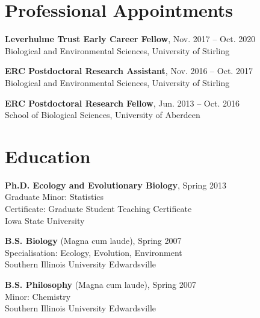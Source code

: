 \documentclass[letterpaper]{article}
\def\name{A. Bradley Duthie}
\renewenvironment{itemize}{
  \begin{list}{}{
    \setlength{\leftmargin}{1.5em}
  }
}{
  \end{list}
}
\begin{document}
\hrulefill

\vspace{0.16in}


\begin{small}

\begin{minipage}{0.65\linewidth}
\section*{Professional Appointments}
\begin{itemize}
	\item{\bf Leverhulme Trust Early Career Fellow}, Nov. 2017 -- Oct. 2020 \\
	Biological and Environmental Sciences, University of Stirling
\end{itemize}
\begin{itemize}
	\item{\bf ERC Postdoctoral Research Assistant}, Nov. 2016 -- Oct. 2017 \\
	Biological and Environmental Sciences, University of Stirling
\end{itemize}
\begin{itemize}
	\item{\bf ERC Postdoctoral Research Fellow}, Jun. 2013 -- Oct. 2016 \\
	School of Biological Sciences, University of Aberdeen
\end{itemize}

\section*{Education}
\begin{itemize}
  \item {\bf Ph.D. Ecology and Evolutionary Biology}, Spring 2013 \\
	Graduate Minor: Statistics \\
	Certificate: Graduate Student Teaching Certificate \\
	Iowa State University
  \item {\bf B.S. Biology} (Magna cum laude), Spring 2007 \\
	Specialisation: Ecology, Evolution, Environment \\
	Southern Illinois University Edwardsville
  \item {\bf B.S. Philosophy} (Magna cum laude), Spring 2007 \\
	Minor: Chemistry \\
	Southern Illinois University Edwardsville
\end{itemize}



\end{minipage}
\end{small}
\end{document}
